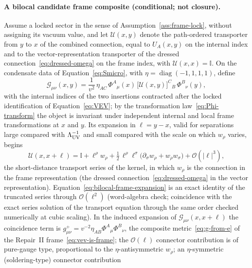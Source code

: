 \paragraph{A bilocal candidate frame composite (conditional; not closure).}
Assume a locked sector in the sense of Assumption~\ref{ass:frame-lock}, without assigning its
vacuum value, and let $\mathcal U(x,y)$ denote the path-ordered transporter from $y$ to $x$ of
the combined connection, equal to $U_A(x,y)$ on the internal index and to the vector-representation
transporter of the dressed connection~\eqref{eq:dressed-omega} on the frame index, with
$\mathcal U(x,x)=\mathbb I$. On the condensate data of Equation~\eqref{eq:Smicro}, with
$\eta=\operatorname{diag}(-1,1,1,1)$, define
\begin{equation}
  \label{eq:bilocal-frame-op}
  \mathcal G_{\mu\nu}(x,y)
  =
  \frac{1}{v^{2}}\,\eta_{AC}\,\Phi^{A}{}_{\mu}(x)\,
  \bigl[\mathcal U(x,y)\bigr]^{C}{}_{B}\,\Phi^{B}{}_{\nu}(y),
\end{equation}
with the internal indices of the two insertions contracted after the locked identification of
Equation~\eqref{eq:VEV}; by the transformation law~\eqref{eq:Phi-transform} the object is
invariant under independent internal and local frame transformations at $x$ and $y$. Its
expansion in $\ell=y-x$, valid for separations large compared with $\Lambda_{\mathrm{UV}}^{-1}$ and small compared with the scale on which $w_{\rho}$ varies, begins
\begin{equation}
  \label{eq:bilocal-frame-expansion}
  \mathcal U(x,x+\ell)
  =
  \mathbb I+\ell^{\rho}w_{\rho}
  +\tfrac{1}{2}\,\ell^{\rho}\ell^{\sigma}
   \bigl(\partial_{\sigma}w_{\rho}+w_{\rho}w_{\sigma}\bigr)
  +\mathcal O(|\ell|^{3}),
\end{equation}
the short-distance transport series of the kernel, in which $w_{\rho}$ is the connection in the
frame representation (the dressed connection~\eqref{eq:dressed-omega} in the vector
representation). Equation~\eqref{eq:bilocal-frame-expansion} is an exact identity of the
truncated series through $\mathcal O(\ell^{2})$ (word-algebra check; coincidence with the exact
series solution of the transport equation through the same order checked numerically at cubic
scaling). In the induced expansion of $\mathcal G_{\mu\nu}(x,x+\ell)$ the coincidence term is
$g^{+}_{\mu\nu}=v^{-2}\eta_{AB}\Phi^{A}{}_{\mu}\Phi^{B}{}_{\nu}$, the composite
metric~\eqref{eq:g-from-e} of the Repair~II frame~\eqref{eq:vev-is-frame}; the
$\mathcal O(\ell)$ connector contribution is of pure-gauge type, proportional to the
$\eta$-antisymmetric $w_{\rho}$; an $\eta$-symmetric (soldering-type) connector contribution
